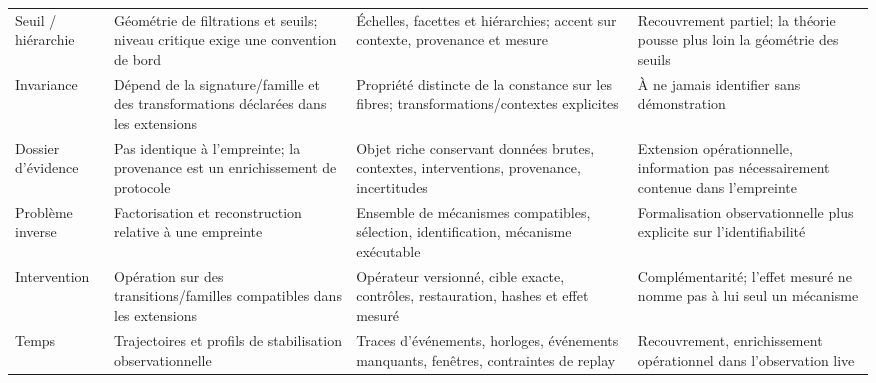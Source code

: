 \documentclass[11pt,a4paper,oneside]{report}
\begin{document}
\begin{longtable}{p{2.5cm}p{4.4cm}p{4.5cm}p{3.2cm}}
Seuil / hiérarchie & Géométrie de filtrations et seuils; niveau critique exige une convention de bord & Échelles, facettes et hiérarchies; accent sur contexte, provenance et mesure & Recouvrement partiel; la théorie pousse plus loin la géométrie des seuils\\
Invariance & Dépend de la signature/famille et des transformations déclarées dans les extensions & Propriété distincte de la constance sur les fibres; transformations/contextes explicites & À ne jamais identifier sans démonstration\\
Dossier d'évidence & Pas identique à l'empreinte; la provenance est un enrichissement de protocole & Objet riche conservant données brutes, contextes, interventions, provenance, incertitudes & Extension opérationnelle, information pas nécessairement contenue dans l'empreinte\\
Problème inverse & Factorisation et reconstruction relative à une empreinte & Ensemble de mécanismes compatibles, sélection, identification, mécanisme exécutable & Formalisation observationnelle plus explicite sur l'identifiabilité\\
Intervention & Opération sur des transitions/familles compatibles dans les extensions & Opérateur versionné, cible exacte, contrôles, restauration, hashes et effet mesuré & Complémentarité; l'effet mesuré ne nomme pas à lui seul un mécanisme\\
Temps & Trajectoires et profils de stabilisation observationnelle & Traces d'événements, horloges, événements manquants, fenêtres, contraintes de replay & Recouvrement, enrichissement opérationnel dans l'observation live\\
\bottomrule
\end{longtable}
\setlength{\tabcolsep}{6pt}
\end{document}
